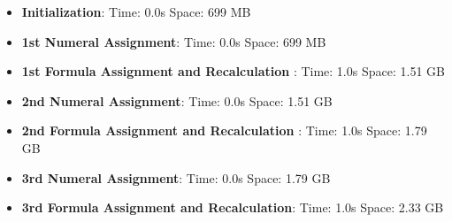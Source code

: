 \documentclass[10pt,a4paper]{article}  %
\begin{document}
\begin{itemize}
    \item \textbf{Initialization}: Time: 0.0s Space: 699 MB
    \item \textbf{1st Numeral Assignment}: Time: 0.0s Space: 699 MB
    \item \textbf{1st Formula Assignment and Recalculation }: Time: 1.0s Space: 1.51 GB
    \item \textbf{2nd Numeral Assignment}: Time: 0.0s Space: 1.51 GB
    \item \textbf{2nd Formula Assignment and Recalculation }: Time: 1.0s Space: 1.79 GB
    \item \textbf{3rd Numeral Assignment}: Time: 0.0s Space: 1.79 GB
    \item \textbf{3rd Formula Assignment and Recalculation}: Time: 1.0s Space: 2.33 GB

    

\end{itemize}


\end{document}

